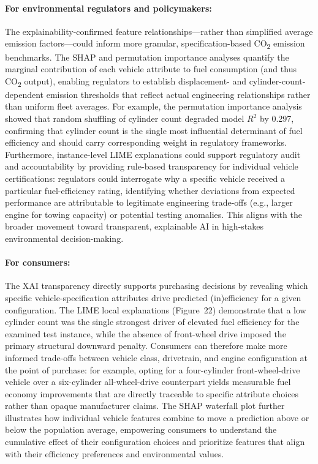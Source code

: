 \paragraph{For environmental regulators and policymakers:}
The explainability-confirmed feature relationships---rather than simplified average emission factors---could inform more granular, specification-based CO\textsubscript{2} emission benchmarks. The SHAP and permutation importance analyses quantify the marginal contribution of each vehicle attribute to fuel consumption (and thus CO\textsubscript{2} output), enabling regulators to establish displacement- and cylinder-count-dependent emission thresholds that reflect actual engineering relationships rather than uniform fleet averages. For example, the permutation importance analysis showed that random shuffling of cylinder count degraded model \(R^2\) by 0.297, confirming that cylinder count is the single most influential determinant of fuel efficiency and should carry corresponding weight in regulatory frameworks. Furthermore, instance-level LIME explanations could support regulatory audit and accountability by providing rule-based transparency for individual vehicle certifications: regulators could interrogate why a specific vehicle received a particular fuel-efficiency rating, identifying whether deviations from expected performance are attributable to legitimate engineering trade-offs (e.g., larger engine for towing capacity) or potential testing anomalies. This aligns with the broader movement toward transparent, explainable AI in high-stakes environmental decision-making.

\paragraph{For consumers:}
The XAI transparency directly supports purchasing decisions by revealing which specific vehicle-specification attributes drive predicted (in)efficiency for a given configuration. The LIME local explanations (Figure~22) demonstrate that a low cylinder count was the single strongest driver of elevated fuel efficiency for the examined test instance, while the absence of front-wheel drive imposed the primary structural downward penalty. Consumers can therefore make more informed trade-offs between vehicle class, drivetrain, and engine configuration at the point of purchase: for example, opting for a four-cylinder front-wheel-drive vehicle over a six-cylinder all-wheel-drive counterpart yields measurable fuel economy improvements that are directly traceable to specific attribute choices rather than opaque manufacturer claims. The SHAP waterfall plot further illustrates how individual vehicle features combine to move a prediction above or below the population average, empowering consumers to understand the cumulative effect of their configuration choices and prioritize features that align with their efficiency preferences and environmental values.



